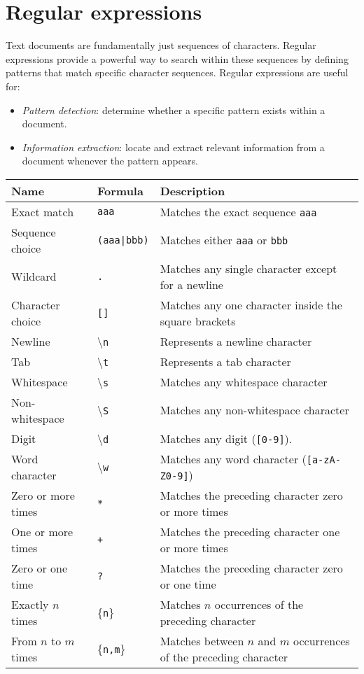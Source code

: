 \section{Regular expressions}

Text documents are fundamentally just sequences of characters. 
Regular expressions provide a powerful way to search within these sequences by defining patterns that match specific character sequences.
Regular expressions are useful for: 
\begin{itemize}
    \item \textit{Pattern detection}: determine whether a specific pattern exists within a document.
    \item \textit{Information extraction}: locate and extract relevant information from a document whenever the pattern appears.
\end{itemize}
\renewcommand{\arraystretch}{1.25}
\begin{table}[!ht]
    \centering
    \begin{tabular}{|l|l|p{9.5cm}|}
    \hline
    \textbf{Name} & \textbf{Formula} & \textbf{Description} \\
    \hline
    Exact match & \texttt{aaa} & Matches the exact sequence \texttt{aaa} \\
    \hline
    Sequence choice & \texttt{(aaa|bbb)} & Matches either \texttt{aaa} or \texttt{bbb} \\
    \hline
    Wildcard & \texttt{.} & Matches any single character except for a newline \\
    \hline
    Character choice & \texttt{[]} & Matches any one character inside the square brackets \\
    \hline
    Newline & \textbackslash \texttt{n} & Represents a newline character \\
    \hline
    Tab & \textbackslash \texttt{t} & Represents a tab character \\
    \hline
    Whitespace & \textbackslash \texttt{s} & Matches any whitespace character \\
    \hline
    Non-whitespace & \textbackslash \texttt{S} & Matches any non-whitespace character \\
    \hline
    Digit & \textbackslash \texttt{d} & Matches any digit (\texttt{[0-9]}). \\
    \hline
    Word character & \textbackslash \texttt{w} & Matches any word character (\texttt{[a-zA-Z0-9]}) \\
    \hline
    Zero or more times & \texttt{*} & Matches the preceding character zero or more times \\
    \hline
    One or more times & \texttt{+} & Matches the preceding character one or more times \\
    \hline
    Zero or one time & \texttt{?} & Matches the preceding character zero or one time \\
    \hline
    Exactly $n$ times & \{\texttt{n}\} & Matches $n$ occurrences of the preceding character \\
    \hline
    From $n$ to $m$ times & \{\texttt{n,m}\} & Matches between $n$ and $m$ occurrences of the preceding character\\
    \hline
    \end{tabular}
\end{table}
